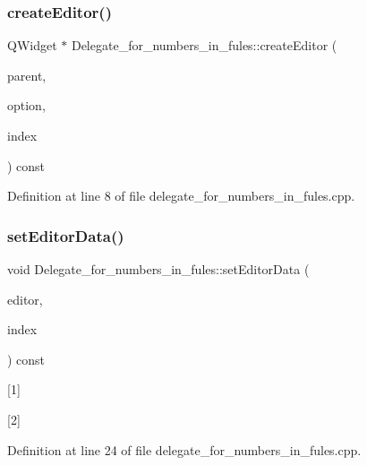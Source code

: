 \subsubsection{\texorpdfstring{create\+Editor()}{createEditor()}}
{\footnotesize\ttfamily Q\+Widget $\ast$ Delegate\+\_\+for\+\_\+numbers\+\_\+in\+\_\+fules\+::create\+Editor (\begin{DoxyParamCaption}\item[{Q\+Widget $\ast$}]{parent,  }\item[{const Q\+Style\+Option\+View\+Item \&}]{option,  }\item[{const Q\+Model\+Index \&}]{index }\end{DoxyParamCaption}) const}



Definition at line 8 of file delegate\+\_\+for\+\_\+numbers\+\_\+in\+\_\+fules.\+cpp.

\mbox{\label{classDelegate__for__numbers__in__fules_a8ed7d13b0ce16e8c830de737d5354725}} 
\subsubsection{\texorpdfstring{set\+Editor\+Data()}{setEditorData()}}
{\footnotesize\ttfamily void Delegate\+\_\+for\+\_\+numbers\+\_\+in\+\_\+fules\+::set\+Editor\+Data (\begin{DoxyParamCaption}\item[{Q\+Widget $\ast$}]{editor,  }\item[{const Q\+Model\+Index \&}]{index }\end{DoxyParamCaption}) const}



\mbox{[}1\mbox{]} 

\mbox{[}2\mbox{]} 

Definition at line 24 of file delegate\+\_\+for\+\_\+numbers\+\_\+in\+\_\+fules.\+cpp.

\mbox{\label{classDelegate__for__numbers__in__fules_a0f0422051323d15ae95017008aa1bac1}} 
